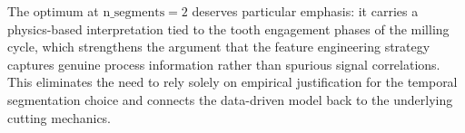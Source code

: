 \documentclass[11pt, a4paper]{article}
\begin{document}
The optimum at $\text{n\_segments} = 2$ deserves particular emphasis: it carries a
physics-based interpretation tied to the tooth engagement phases of the milling
cycle, which strengthens the argument that the feature engineering strategy captures
genuine process information rather than spurious signal correlations.
This eliminates the need to rely solely on empirical justification for the temporal
segmentation choice and connects the data-driven model back to the underlying
cutting mechanics.

\end{document}
